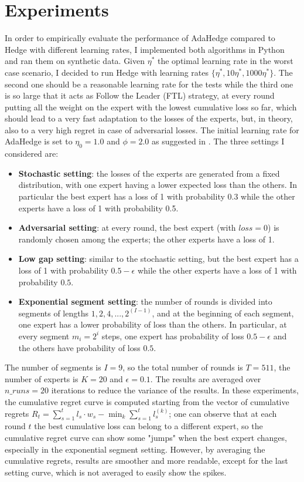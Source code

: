 \documentclass{article}
\begin{document}
\section{Experiments}
In order to empirically evaluate the performance of AdaHedge compared to Hedge with different learning rates, 
I implemented both algorithms in Python and ran them on synthetic data.
Given $\eta^*$ the optimal learning rate in the worst case scenario, I decided to run Hedge with learning rates $\{\eta^*, 10\eta^*, 1000\eta^*  \}$. 
The second one should be a reasonable learning rate for the tests while
the third one is so large that it acts as Follow the Leader (FTL) strategy, at every round putting all the weight on the expert with the lowest cumulative loss so far,
which should lead to a very fast adaptation to the losses of the experts, but, in theory, also to a very high regret in case of adversarial losses.
The initial learning rate for AdaHedge is set to $\eta_0 = 1.0$ and $\phi = 2.0$ as suggested in \cite{ADA_HEDGE}.
The three settings I considered are:
\begin{itemize}
    \item \textbf{Stochastic setting}: the losses of the experts are generated from a fixed distribution, with one expert having a lower expected loss than the others.
    In particular the best expert has a loss of 1 with probability 0.3 while the other experts have a loss of 1 with probability 0.5.
    \item \textbf{Adversarial setting}: at every round, the best expert (with $loss=0$) is randomly chosen among the experts; the other experts have a loss of 1.
    \item \textbf{Low gap setting}: similar to the stochastic setting, but the best expert has a loss of 1 with probability $0.5 - \epsilon$ while 
    the other experts have a loss of 1 with probability $0.5$.
    \item \textbf{Exponential segment setting}: the number of rounds is divided into segments of lengths $1, 2, 4, ..., 2^(I-1)$, and at the beginning of each segment, one expert has a lower probability of loss than the others. 
    In particular, at every segment $m_i = 2^i$ steps, one expert has probability of loss $0.5 - \epsilon$ and the others have probability of loss $0.5$.
\end{itemize}
The number of segments is $I=9$, so the total number of rounds is $T=511$, the number of experts is $K=20$ and $\epsilon = 0.1$. The results are averaged over $n\_runs=20$ iterations 
to reduce the variance of the results.
In these experiments, the cumulative regret curve is computed starting from the vector of cumulative regrets $R_t = \sum_{s=1}^t l_s \cdot w_s - \min_{k} \sum_{s=1}^t l_s^{(k)}$;
one can observe that at each round $t$ the best cumulative loss can belong to a different expert, so the cumulative regret curve can show some "jumps" when the best expert changes, especially in the exponential segment setting.
However, by averaging the cumulative regrets, results are smoother and more readable, except for the last setting curve, which is not averaged to easily show the spikes.
\end{document}
